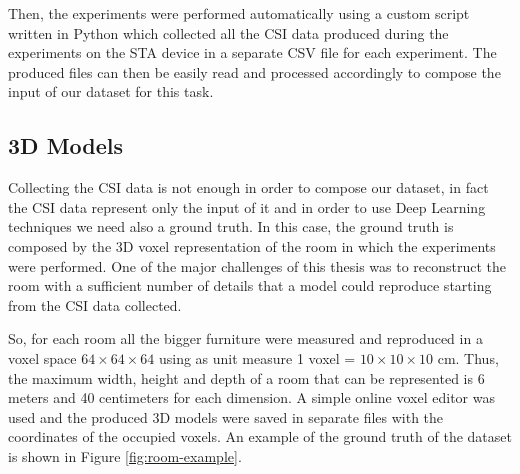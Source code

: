 \documentclass[binding=0.6cm,noexaminfo]{sapthesis}
\begin{document}
Then, the experiments were performed automatically using a custom script written in Python which collected all the CSI data produced during the experiments on the STA device in a separate CSV file for each experiment. The produced files can then be easily read and processed accordingly to compose the input of our dataset for this task.

\subsection{3D Models}

Collecting the CSI data is not enough in order to compose our dataset, in fact the CSI data represent only the input of it and in order to use Deep Learning techniques we need also a ground truth. In this case, the ground truth is composed by the 3D voxel representation of the room in which the experiments were performed. One of the major challenges of this thesis was to reconstruct the room with a sufficient number of details that a model could reproduce starting from the CSI data collected.

So, for each room all the bigger furniture were measured and reproduced in a voxel space $64 \times 64 \times 64$ using as unit measure 1 voxel = $10 \times 10 \times 10$ cm. Thus, the maximum width, height and depth of a room that can be represented is 6 meters and 40 centimeters for each dimension.
A simple online voxel editor was used and the produced 3D models were saved in separate files with the coordinates of the occupied voxels. An example of the ground truth of the dataset is shown in Figure \ref{fig:room-example}.
\end{document}
